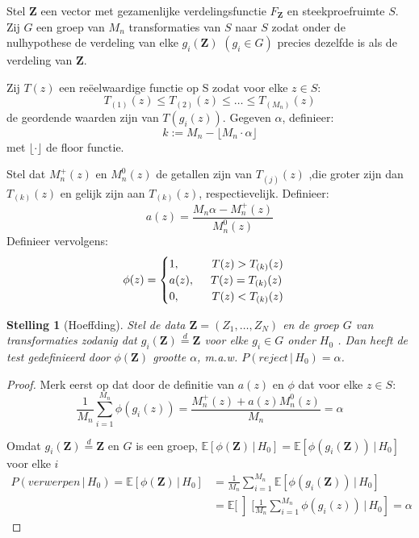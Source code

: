 \documentclass[12pt, a4paper, faculty=we]{ugent-doc}
\newcommand{\E}[1]{\mathds{E}[#1]}
\newcommand{\bfZ}{\textbf{Z}}
\newtheorem{stelling}{Stelling}
\begin{document}
\begin{flushleft}
    Stel \(\mathbf{Z}\) een vector met gezamenlijke verdelingsfunctie \(F_{\mathbf{Z}}\) en steekproefruimte \(S\).
    Zij \(G\) een groep van \(M_n\) transformaties van $S$ naar \(S\) zodat onder de nulhypothese de verdeling van elke \(g_i(\mathbf{Z})\) \((g_i\in G)\) precies dezelfde is als de verdeling van \(\mathbf{Z}\).

    Zij \(T(z)\) een reëelwaardige functie op S zodat voor elke \(z\in S\):
    \[T_{(1)}(z)\leq T_{(2)}(z) \leq \dots \leq T_{(M_n)}(z)\]
    de geordende waarden zijn van \(T(g_i(z))\). Gegeven \(\alpha\), definieer:
    \[k:= M_n-\bigl \lfloor M_n\cdot\alpha \bigr \rfloor\] met \(\lfloor \cdot \rfloor\) de floor functie.

    Stel dat \(M_n^+(z)\) en \(M_n^0(z)\) de getallen zijn van \(T_{(j)}(z)\) ,die groter zijn dan \(T_{(k)}(z)\) en gelijk zijn aan \(T_{(k)}(z)\), respectievelijk. Definieer:
    \[a(z) = \frac{M_n\alpha-M_n^+(z)}{M_n^0(z)}\]
    Definieer vervolgens:
    \[\phi(z)= \begin{cases}
        1,\hspace{1cm}T(z)> T_{(k)}(z)\\
        a(z),\hspace{0.50cm}T(z)=T_{(k)}(z)\\
        0,\hspace{1cm}T(z) < T_{(k)}(z)
    \end{cases}\]
    \begin{stelling}[Hoeffding]
        \label{theorem: Hoeffding}
        Stel de data \(\bfZ= (Z_1,\dots, Z_N) \) en de groep \(G\) van transformaties zodanig dat \(g_i(\bfZ) \overset{d}{=} \bfZ\) voor elke \(g_i \in G\) onder \(H_0\) . Dan heeft de test
    gedefinieerd door \(\phi(\bfZ)\) grootte \(\alpha\), m.a.w. \(P(reject \, | \, H_0) = \alpha\).
    \end{stelling}
    \begin{proof}
        Merk eerst op dat door de definitie van $a(z)$ en $\phi$ dat voor elke $z \in S$:
        \[\frac{1}{M_n}\sum_{i=1}^{M_n}\phi(g_i(z))=\frac{M_n^+(z)+a(z)M_n^0(z)}{M_n}=\alpha\]

        Omdat \(g_i(\bfZ) \overset{d}{=} \bfZ\) en \(G\) is een groep, \(\E{\phi(\bfZ) \, | \, H_0}=\E{\phi(g_i(\bfZ)) \, | \, H_0}\) voor elke \(i\)
        \begin{align*}
            P(verwerpen \, | \, H_0)=\E{\phi(\bfZ) \, | \, H_0}&=\frac{1}{M_n}\sum_{i=1}^{M_n}\E{\phi(g_i(\bfZ)) \, | \, H_0}\\
            &=\E\left[ \frac{1}{M_n}\sum_{i=1}^{M_n}\phi(g_i(z)) \, | \, H_0 \right]=\alpha
        \end{align*}
    \end{proof}
\end{flushleft}
\end{document}
